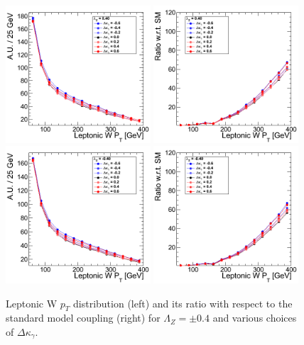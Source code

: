 \begin{figure}[h!t]
  {\centering
    \includegraphics[width=0.48\textwidth]{figs/LeptonicWpT_040.png}
    \includegraphics[width=0.48\textwidth]{figs/LeptonicWpT_040_ratio.png}
    \includegraphics[width=0.48\textwidth]{figs/LeptonicWpT_m040.png}
    \includegraphics[width=0.48\textwidth]{figs/LeptonicWpT_m040_ratio.png}
    \caption{Leptonic W $p_T$ distribution (left) and its ratio with respect to 
    the standard model coupling (right) for $\Lambda_Z = \pm 0.4$ and various choices of $\Delta{\kappa_\gamma}$.}
    \label{fig:ww_LeptonicWpT_atgcRatio04}}
\end{figure}
